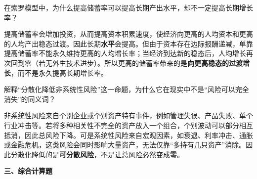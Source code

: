 \begin{question}
在索罗模型中，为什么提高储蓄率可以提高长期产出水平，却不一定提高长期增长率？

\begin{solution}
提高储蓄率会增加投资，从而提高资本积累速度，使经济向更高的人均资本和更高的人均产出稳态过渡。因此长期\textbf{水平}会提高。但由于资本存在边际报酬递减，单靠提高储蓄率不能永久维持更高的人均增长率；当经济到达新的稳态后，人均增长再次回到零（若无外生技术进步）。所以更高的储蓄率带来的是\textbf{向更高稳态的过渡增长}，而不是永久提高长期增长率。
\end{solution}
\end{question}

\begin{question}
解释“分散化降低非系统性风险”这一命题，为什么它在现实中不是“风险可以完全消失”的同义词？

\begin{solution}
非系统性风险来自个别企业或个别资产特有事件，例如管理失误、产品失败、单个行业冲击等。若将多种相关性不完全的资产放入一个组合，个别波动可以部分相互抵消，因此总风险下降。可是系统性风险来自宏观因素，如衰退、利率冲击、通胀或金融危机，这类风险会同时影响大量资产，无法仅靠“多持有几只资产”消除。因此分散化降低的是\textbf{可分散风险}，不是让总风险必然变成零。
\end{solution}
\end{question}

\textbf{三、综合计算题}

